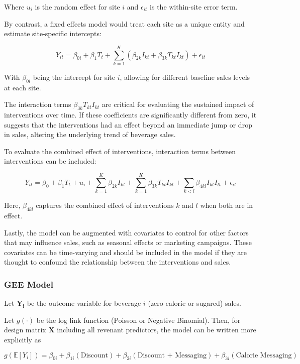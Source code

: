 \documentclass[
]{article}
\begin{document}
Where \(u_i\) is the random effect for site \(i\) and \(\epsilon_{it}\)
is the within-site error term.

By contrast, a fixed effects model would treat each site as a unique
entity and estimate site-specific intercepts:

\[Y_{it} = \beta_{0i} + \beta_1 T_t + \sum_{k=1}^{K} (\beta_{2k} I_{kt} + \beta_{3k} T_{kt} I_{kt}) + \epsilon_{it} \]

With \(\beta_{0i}\) being the intercept for site \(i\), allowing for
different baseline sales levels at each site.

The interaction terms \(\beta_{3k} T_{kt} I_{kt}\) are critical for
evaluating the sustained impact of interventions over time. If these
coefficients are significantly different from zero, it suggests that the
interventions had an effect beyond an immediate jump or drop in sales,
altering the underlying trend of beverage sales.

To evaluate the combined effect of interventions, interaction terms
between interventions can be included:

\[Y_{it} = \beta_0 + \beta_1 T_t + u_i + \sum_{k=1}^{K} \beta_{2k} I_{kt} + \sum_{k=1}^{K} \beta_{3k} T_{kt} I_{kt} + \sum_{k<l} \beta_{4kl} I_{kt} I_{lt} + \epsilon_{it} \]

Here, \(\beta_{4kl}\) captures the combined effect of interventions
\(k\) and \(l\) when both are in effect.

Lastly, the model can be augmented with covariates to control for other
factors that may influence sales, such as seasonal effects or marketing
campaigns. These covariates can be time-varying and should be included
in the model if they are thought to confound the relationship between
the interventions and sales.

\hypertarget{gee-model}{%
\subsubsection{GEE Model}\label{gee-model}}

Let \(\mathbf{Y_i}\) be the outcome variable for beverage \(i\)
(zero-calorie or sugared) sales.

Let \(g(\cdot)\) be the log link function (Poisson or Negative
Binomial). Then, for design matrix \(\mathbf{X}\) including all revenant
predictors, the model can be written more explicitly as

\[
g(\mathbb{E}[Y_i]) = \beta_{0i} + \beta_{1i} (\text{Discount}) + \beta_{2i} (\text{Discount + Messaging}) + \beta_{3i} (\text{Calorie Messaging}) 
\]
\end{document}
